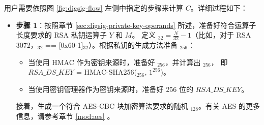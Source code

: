 \documentclass[main\_\_CN.tex]{subfiles}
\begin{document}
用户需要依照图 \ref{fig:digsig-flow} 左侧中指定的步骤来计算 \begin{math}C\end{math}。详细过程如下：

\begin{itemize}

    \item {\bfseries 步骤 1}：按照章节 \ref{sec:digsig-private-key-operands} 所述，准备好符合运算子长度要求的 RSA 私钥运算子 \begin{math}Y\end{math} 和 \begin{math}M\end{math}。
          定义 \begin{math}[L]_{32} = \frac{N}{32}-1 \end{math}（比如，对于 RSA 3072，\begin{math}[L]_{32}\end{math} == [0x60-1]\begin{math}_{32}\end{math}）。根据私钥的生成方法准备 \begin{math}[RSA\_DS\_KEY]_{256}\end{math}：
          \begin{itemize}
              \item 当使用 HMAC 作为密钥来源时，准备好 \begin{math}[HMAC\_KEY]_{256}\end{math}，并计算出 \begin{math}[RSA\_DS\_KEY]_{256}\end{math}， 即 \begin{math}RSA\_DS\_KEY\end{math} = HMAC-SHA256(\begin{math}[HMAC\_KEY]_{256}\end{math}, \begin{math}1^{256}\end{math})。
              \item 当使用密钥管理器作为密钥来源时，准备好 256 位的 \begin{math}RSA\_DS\_KEY\end{math}。
          \end{itemize}
          接着，生成一个符合 AES-CBC 块加密算法要求的随机 \begin{math}[IV]_{128}\end{math}。有关 AES 的更多信息，请参考章节 \ref{mod:aes} \textit{}。


\end{itemize}
\end{document}
